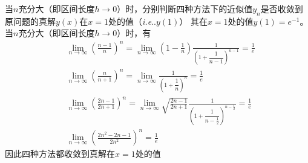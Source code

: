 \documentclass[11pt]{article}
\makeatletter
\DeclareRobustCommand\onedot{\futurelet\@let@token\@onedot}
\def\@onedot{\ifx\@let@token.\else.\null\fi\xspace}
\def\ie{\emph{i.e}\onedot}
\makeatother
\begin{document}
\begin{question}
\begin{subquestion}{当$n$充分大（即区间长度$h \rightarrow 0$）时，分别判断四种方法下的近似值$y_n$是否收敛到原问题的真解$y(x)$在$x = 1$处的值（\ie $y(1)$）}
{            其在$x = 1$处的值$y(1) = e^{-1}$。当$n$充分大（即区间长度$h \rightarrow 0$）时，有
            \begin{align*}
                 & \lim_{n \rightarrow \infty}\left(\frac{n - 1}{n}\right)^{n} = \lim_{n \rightarrow \infty}\left(1 - \frac{1}{n}\right)\frac{1}{\left(1 + \dfrac{1}{n - 1}\right)^{n - 1}} = \frac{1}{e}                            \\
                 & \lim_{n \rightarrow \infty}\left(\frac{n}{n + 1}\right)^{n} = \lim_{n \rightarrow \infty}\frac{1}{\left(1 + \dfrac{1}{n}\right)^{n}} = \frac{1}{e}                                                                \\
                 & \lim_{n \rightarrow \infty}\left(\frac{2n - 1}{2n + 1}\right)^{n} = \lim_{n \rightarrow \infty}\sqrt{\frac{2n - 1}{2n + 1}}\frac{1}{\left(1 + \dfrac{1}{n - \frac{1}{2}}\right)^{n - \frac{1}{2}}} =  \frac{1}{e} \\
                 & \lim_{n \rightarrow \infty}\left(\frac{2n^2 - 2n - 1}{2n^2}\right)^{n} = \frac{1}{e}
            \end{align*}
            因此四种方法都收敛到真解在$x = 1$处的值
        }
    \end{subquestion}
\end{question}
\end{document}
